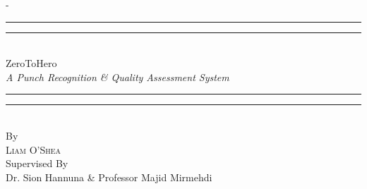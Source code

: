 %
%
% 
%
%
\begin{titlingpage}
\begin{SingleSpace}
\calccentering{\unitlength} 
\begin{adjustwidth*}{\unitlength}{-\unitlength}
\vspace*{13mm}
\begin{center}
\rule[0.5ex]{\linewidth}{2pt}\vspace*{-\baselineskip}\vspace*{3.2pt}
\rule[0.5ex]{\linewidth}{1pt}\\[\baselineskip]
{\HUGE ZeroToHero }\\[4mm]
{\Large \textit{A Punch Recognition \& Quality Assessment System}}\\
\rule[0.5ex]{\linewidth}{1pt}\vspace*{-\baselineskip}\vspace{3.2pt}
\rule[0.5ex]{\linewidth}{2pt}\\
\vspace{6.5mm}
{\large By}\\
\vspace{5.0mm}
{\large\textsc{Liam O'Shea}}\\
\vspace{5.0mm}
{\large Supervised By}\\
\vspace{5.0mm}\tabularnewline
{\large {Dr. Sion Hannuna \& Professor Majid Mirmehdi}}


\end{center}
\end{adjustwidth*}
\end{SingleSpace}
\end{titlingpage}
